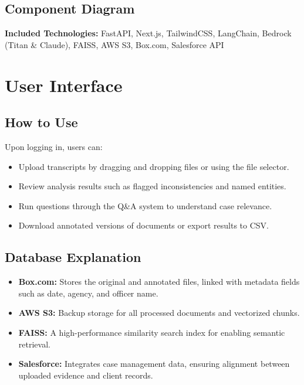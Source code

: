 \documentclass[11pt]{article}
\begin{document}
\subsection{Component Diagram}
\textbf{Included Technologies:}  
FastAPI, Next.js, TailwindCSS, LangChain, Bedrock (Titan \& Claude), FAISS, AWS S3, Box.com, Salesforce API

\newpage
\section{User Interface}
\subsection{How to Use}
Upon logging in, users can:
\begin{itemize}
\item Upload transcripts by dragging and dropping files or using the file selector.
\item Review analysis results such as flagged inconsistencies and named entities.
\item Run questions through the Q\&A system to understand case relevance.
\item Download annotated versions of documents or export results to CSV.
\end{itemize}

\subsection{Database Explanation}
\begin{itemize}
\item \textbf{Box.com:} Stores the original and annotated files, linked with metadata fields such as date, agency, and officer name.
\item \textbf{AWS S3:} Backup storage for all processed documents and vectorized chunks.
\item \textbf{FAISS:} A high-performance similarity search index for enabling semantic retrieval.
\item \textbf{Salesforce:} Integrates case management data, ensuring alignment between uploaded evidence and client records.
\end{itemize}

\newpage
\end{document}

